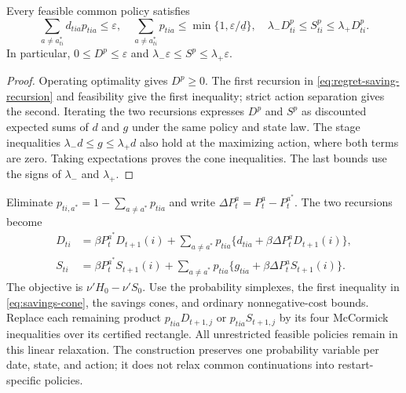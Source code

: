 \begin{lemma}\label{lem:savings-cone}
Every feasible common policy satisfies
\begin{equation}\label{eq:savings-cone}
 \sum_{a\ne a^*_{ti}}d_{tia}p_{tia}\leq\varepsilon,\quad
 \sum_{a\ne a^*_{ti}}p_{tia}\leq\min\{1,\varepsilon/\underline d\},\quad
 \lambda_-D^p_{ti}\leq S^p_{ti}\leq\lambda_+D^p_{ti}.
\end{equation}
In particular, $0\leq D^p\leq\varepsilon$ and
$\lambda_-\varepsilon\leq S^p\leq\lambda_+\varepsilon$.
\end{lemma}
\begin{proof}
Operating optimality gives $D^p\geq0$. The first recursion in \eqref{eq:regret-saving-recursion} and feasibility give the first inequality; strict action separation gives the second. Iterating the two recursions expresses $D^p$ and $S^p$ as discounted expected sums of $d$ and $g$ under the same policy and state law. The stage inequalities $\lambda_-d\leq g\leq\lambda_+d$ also hold at the maximizing action, where both terms are zero. Taking expectations proves the cone inequalities. The last bounds use the signs of $\lambda_-$ and $\lambda_+$.
\end{proof}

Eliminate $p_{ti,a^*}=1-\sum_{a\ne a^*}p_{tia}$ and write $\Delta P^a_t=P^a_t-P^{a^*}_t$. The two recursions become
\begin{align}
 D_{ti}&=\beta P^{a^*}_tD_{t+1}(i)+\sum_{a\ne a^*}p_{tia}\{d_{tia}+\beta\Delta P^a_tD_{t+1}(i)\},\label{eq:reduced-D}\\
 S_{ti}&=\beta P^{a^*}_tS_{t+1}(i)+\sum_{a\ne a^*}p_{tia}\{g_{tia}+\beta\Delta P^a_tS_{t+1}(i)\}.\label{eq:reduced-S}
\end{align}
The objective is $\nu'H_0-\nu'S_0$. Use the probability simplexes, the first inequality in \eqref{eq:savings-cone}, the savings cones, and ordinary nonnegative-cost bounds. Replace each remaining product $p_{tia}D_{t+1,j}$ or $p_{tia}S_{t+1,j}$ by its four McCormick inequalities over its certified rectangle. All unrestricted feasible policies remain in this linear relaxation. The construction preserves one probability variable per date, state, and action; it does not relax common continuations into restart-specific policies.

